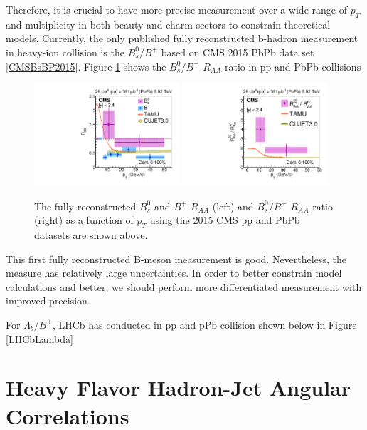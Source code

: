 


Therefore, it is crucial to have more precise measurement over a wide range of $p_T$ and multiplicity in both beauty and charm sectors to constrain theoretical models. Currently, the only published fully reconstructed b-hadron measurement in heavy-ion collision is the $B^0_s/B^+$ based on CMS 2015 PbPb data set \ref{CMSBsBP2015}. Figure \ref{BsBP2015} shows the $B^0_s/B^+$ $R_{AA}$ ratio in pp and PbPb collisions

\begin{figure}[hbtp]
\begin{center}
\includegraphics[width=0.48\textwidth]{Figures/Chapter2/CMSBsBPRAA2015.png}
\includegraphics[width=0.48\textwidth]{Figures/Chapter2/CMSBsBP2015.png}
\caption{The fully reconstructed $B^0_s$ and $B^+$ $R_{AA}$ (left) and $B^0_s/B^+$ $R_{AA}$ ratio (right) as a function of $p_T$ using the 2015 CMS pp and PbPb datasets are shown above.}
\label{BsBP2015}
\end{center}
\end{figure}   

This first fully reconstructed B-meson measurement is good. Nevertheless, the measure has relatively large uncertainties. In order to better constrain model calculations and better, we should perform more differentiated measurement with improved precision. 

For $\Lambda_b/B^+$, LHCb has conducted in pp and pPb collision shown below in Figure \ref{LHCbLambda}




\section{Heavy Flavor Hadron-Jet Angular Correlations}

